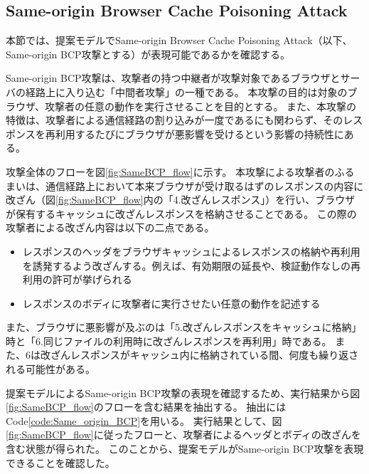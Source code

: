 \documentclass[journal]{IEEEtran}
\begin{document}

\subsection{Same-origin Browser Cache Poisoning Attack}
\label{sec:same-origin-bcp}
本節では、提案モデルでSame-origin Browser Cache Poisoning Attack\cite{bcpattack}（以下、Same-origin BCP攻撃とする）が表現可能であるかを確認する。

Same-origin BCP攻撃は、攻撃者の持つ中継者が攻撃対象であるブラウザとサーバの経路上に入り込む「中間者攻撃」の一種である。
本攻撃の目的は対象のブラウザ、攻撃者の任意の動作を実行させることを目的とする。
また、本攻撃の特徴は、攻撃者による通信経路の割り込みが一度であるにも関わらず、そのレスポンスを再利用するたびにブラウザが悪影響を受けるという影響の持続性にある。

攻撃全体のフローを図\ref{fig:SameBCP_flow}に示す。
本攻撃による攻撃者のふるまいは、通信経路上において本来ブラウザが受け取るはずのレスポンスの内容に改ざん（図\ref{fig:SameBCP_flow}内の「4.改ざんレスポンス」）を行い、ブラウザが保有するキャッシュに改ざんレスポンスを格納させることである。
この際の攻撃者による改ざん内容は以下の二点である。
\begin{itemize}
\item レスポンスのヘッダをブラウザキャッシュによるレスポンスの格納や再利用を誘発するよう改ざんする。例えば、有効期限の延長や、検証動作なしの再利用の許可が挙げられる
\item レスポンスのボディに攻撃者に実行させたい任意の動作を記述する
\end{itemize}
また、ブラウザに悪影響が及ぶのは「5.改ざんレスポンスをキャッシュに格納」時と「6.同じファイルの利用時に改ざんレスポンスを再利用」時である。
また、6は改ざんレスポンスがキャッシュ内に格納されている間、何度も繰り返される可能性がある。


提案モデルによるSame-origin BCP攻撃の表現を確認するため、実行結果から図\ref{fig:SameBCP_flow}のフローを含む結果を抽出する。
抽出にはCode\ref{code:Same_origin_BCP}を用いる。
実行結果として、図\ref{fig:SameBCP_flow}に従ったフローと、攻撃者によるヘッダとボディの改ざんを含む状態が得られた。
このことから、提案モデルがSame-origin BCP攻撃を表現できることを確認した。
\end{document}
